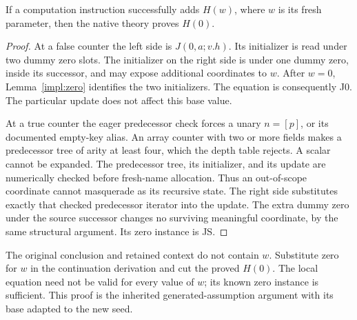 \begin{lemma}
\label{impl:supply}
If a computation instruction successfully adds $H(w)$, where $w$ is its
fresh parameter, then the native theory proves $H(0)$.
\end{lemma}
\begin{proof}
At a false counter the left side is $J(0,a;v.h)$. Its initializer is
read under two dummy zero slots. The initializer on the right side is
under one dummy zero, inside its successor, and may expose additional
coordinates to $w$. After $w=0$, Lemma~\ref{impl:zero} identifies the
two initializers. The equation is consequently J0. The particular update
does not affect this base value.

At a true counter the eager predecessor check forces a unary $n=[p]$,
or its documented empty-key alias. An array counter with two or more
fields makes a predecessor tree of arity at least four, which the depth
table rejects. A scalar cannot be expanded. The predecessor tree, its
initializer, and its update are numerically checked before fresh-name
allocation. Thus an out-of-scope coordinate cannot masquerade as its
recursive state. The right side substitutes exactly that checked
predecessor iterator into the update. The extra dummy zero under the
source successor changes no surviving meaningful coordinate, by the
same structural argument. Its zero instance is JS.
\end{proof}

The original conclusion and retained context do not contain $w$.
Substitute zero for $w$ in the continuation derivation and cut the
proved $H(0)$. The local equation need not be valid for every value of
$w$; its known zero instance is sufficient. This proof is the inherited
generated-assumption argument with its base adapted to the new seed.

